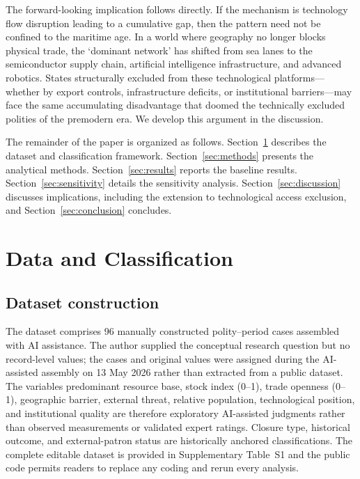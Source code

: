 \documentclass[pdflatex,sn-basic]{sn-jnl}
\theoremstyle{thmstyleone}%
\theoremstyle{thmstyletwo}%
\theoremstyle{thmstylethree}%
\begin{document}
The forward-looking implication follows directly. If the mechanism is technology flow disruption leading to a cumulative gap, then the pattern need not be confined to the maritime age. In a world where geography no longer blocks physical trade, the `dominant network' has shifted from sea lanes to the semiconductor supply chain, artificial intelligence infrastructure, and advanced robotics. States structurally excluded from these technological platforms---whether by export controls, infrastructure deficits, or institutional barriers---may face the same accumulating disadvantage that doomed the technically excluded polities of the premodern era. We develop this argument in the discussion.

The remainder of the paper is organized as follows. Section~\ref{sec:data} describes the dataset and classification framework. Section~\ref{sec:methods} presents the analytical methods. Section~\ref{sec:results} reports the baseline results. Section~\ref{sec:sensitivity} details the sensitivity analysis. Section~\ref{sec:discussion} discusses implications, including the extension to technological access exclusion, and Section~\ref{sec:conclusion} concludes.

\section{Data and Classification}\label{sec:data}

\subsection{Dataset construction}\label{sec:data-construction}

The dataset comprises 96 manually constructed polity--period cases assembled with AI assistance. The author supplied the conceptual research question but no record-level values; the cases and original values were assigned during the AI-assisted assembly on 13 May 2026 rather than extracted from a public dataset. The variables predominant resource base, stock index (0--1), trade openness (0--1), geographic barrier, external threat, relative population, technological position, and institutional quality are therefore exploratory AI-assisted judgments rather than observed measurements or validated expert ratings. Closure type, historical outcome, and external-patron status are historically anchored classifications. The complete editable dataset is provided in Supplementary Table~S1 and the public code permits readers to replace any coding and rerun every analysis.
\end{document}

